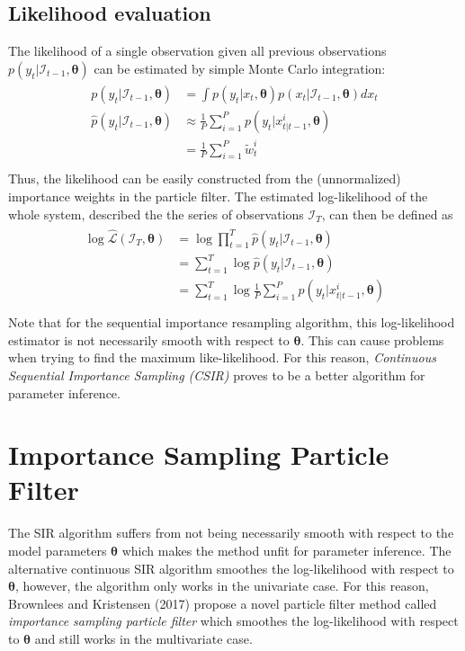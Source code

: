 \documentclass[11pt, oneside]{scrreprt}   	%
\begin{document}
\subsection{Likelihood evaluation}
The likelihood of a single observation given all previous observations $p(y_t | \mathcal{I}_{t-1}, \boldsymbol{\theta})$ can be estimated by simple Monte Carlo integration:
\begin{align} 
\begin{split}
p(y_t | \mathcal{I}_{t-1}, \boldsymbol{\theta}) &= \int p(y_t | x_t, \boldsymbol{\theta}) p(x_t | \mathcal{I}_{t-1}, \boldsymbol{\theta}) d x_t \\
\hat{p}(y_t | \mathcal{I}_{t-1}, \boldsymbol{\theta}) &\approx \frac{1}{P} \sum_{i=1}^P p(y_t | x_{t | t-1}^i, \boldsymbol{\theta})\\
 &= \frac{1}{P} \sum_{i=1}^P \tilde{w}_t^i\\
\end{split}					
\end{align}
Thus, the likelihood can be easily constructed from the (unnormalized) importance weights in the particle filter. The estimated log-likelihood of the whole system, described the the series of observations $\mathcal{I}_T$, can then be defined as
\begin{align} 
\begin{split}
\log \hat{\mathcal{L}}(\mathcal{I}_T, \boldsymbol{\theta}) &= \log \prod_{t=1}^T \hat{p}(y_t | \mathcal{I}_{t-1}, \boldsymbol{\theta}) \\
&= \sum_{t=1}^T \log \hat{p}(y_t | \mathcal{I}_{t-1}, \boldsymbol{\theta}) \\
&= \sum_{t=1}^T \log \frac{1}{P} \sum_{i=1}^P p(y_t | x_{t | t-1}^i, \boldsymbol{\theta}) \\
\end{split}					
\end{align} 
Note that for the sequential importance resampling algorithm, this log-likelihood estimator is not necessarily smooth with respect to $\boldsymbol{\theta}$. This can cause problems when trying to find the maximum like-likelihood. For this reason, \textit{Continuous Sequential Importance Sampling (CSIR)} proves to be a better algorithm for parameter inference.

\section{Importance Sampling Particle Filter}
The SIR algorithm suffers from not being necessarily smooth with respect to the model parameters $\boldsymbol{\theta}$ which makes the method unfit for parameter inference. The alternative continuous SIR algorithm smoothes the log-likelihood with respect to $\boldsymbol{\theta}$, however, the algorithm only works in the univariate case. For this reason, Brownlees and Kristensen (2017) propose a novel particle filter method called \textit{importance sampling particle filter} which smoothes the log-likelihood with respect to $\boldsymbol{\theta}$ and still works in the multivariate case. \\
\end{document}
